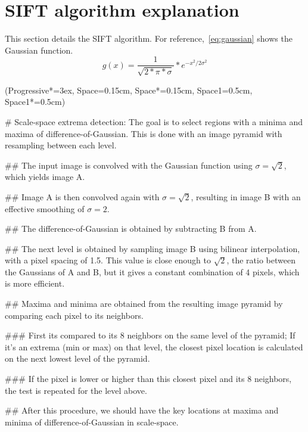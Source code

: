 
\section{SIFT algorithm explanation}

This section details the SIFT algorithm.
For reference,~\ref{eq:gaussian} shows the Gaussian function.
\begin{equation}
  \label{eq:gaussian}
  g(x) = \frac{1}{\sqrt{2*\pi*\sigma}}*e^{-x^2/2\sigma^2}
\end{equation}


\begin{easylist}
  \ListProperties(Progressive*=3ex, Space=0.15cm, Space*=0.15cm, Space1=0.5cm, Space1*=0.5cm)

# Scale-space extrema detection: The goal is to select regions with a minima
and maxima of difference-of-Gaussian. This is done with an image pyramid with
resampling between each level.

## The input image is convolved with the Gaussian function using
\(\sigma=\sqrt{2}\), which yields image A.\label{extrema:conv}

## Image A is then convolved again with
\(\sigma=\sqrt{2}\), resulting in image B with an effective smoothing of
\(\sigma=2\).\label{extrema:conv2}

## The difference-of-Gaussian is obtained by subtracting B from
A.\label{extrema:subs}

## The next level is obtained by sampling image B using bilinear interpolation,
with a pixel spacing of 1.5. This value is close enough to \(\sqrt{2}\), the
ratio between the Gaussians of A and B, but it gives a constant combination of
4 pixels, which is more efficient.\label{extrema:interp}

## Maxima and minima are obtained from the resulting image pyramid by comparing
each pixel to its neighbors.\label{extrema:compare1}

### First its compared to its 8 neighbors on the same level of the pyramid; If
it's an extrema (min or max) on that level, the closest pixel location is
calculated on the next lowest level of the pyramid.\label{extrema:compare2}

### If the pixel is lower or higher than this closest pixel and its 8
neighbors, the test is repeated for the level above.\label{extrema:compare3}

## After this procedure, we should have the key locations at maxima and minima
of difference-of-Gaussian in scale-space.


\end{easylist}
